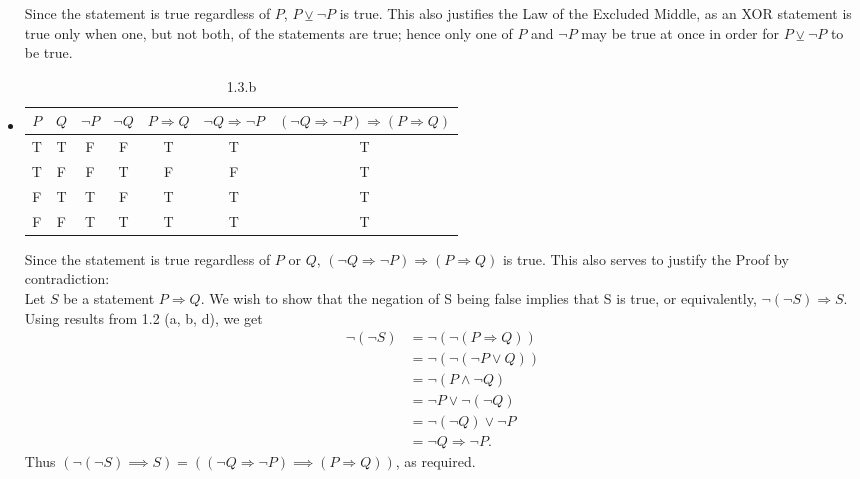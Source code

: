 \documentclass{homework}
\begin{document}
\begin{solution}
\begin{itemize}
\begin{table}[htpb]
\begin{tabular}{c|c|c}
        \end{tabular}
      \end{table}
      Since the statement is true regardless of $P$, $P \veebar \neg P$ is true. This also
      justifies the Law of the Excluded Middle, as an XOR statement is true only when one, but
      not both, of the statements are true; hence only one of $P$ and $\neg P$ may be true at
      once in order for $P \veebar \neg P$ to be true.
    \item 
      \begin{table}[htpb]
        \centering
        \caption{1.3.b}
        \begin{tabular}{c|c|c|c|c|c|c}
          $P$ & $Q$ & $\neg P$ &  $\neg Q$ & $P\Rightarrow Q$ & $\neg Q \Rightarrow \neg P$ & 
          $\left( \neg Q \Rightarrow \neg P \right) \Rightarrow \left( P\Rightarrow Q \right) $\\
          \toprule \bottomrule
          T & T & F & F & T & T & T\\
          T & F & F & T & F & F & T\\
          F & T & T & F & T & T & T\\
          F & F & T & T & T & T & T
        \end{tabular}
      \end{table}
      Since the statement is true regardless of $P$ or $Q$, $\left( \neg Q \Rightarrow \neg P
      \right) \Rightarrow \left( P\Rightarrow Q \right)$ is true. This also serves to justify the
      Proof by contradiction: \\

      Let $S$ be a statement $P\Rightarrow Q$. We wish to show that the negation of S being false
      implies that S is true, or equivalently, $\neg (\neg S) \Rightarrow S$. Using results from 1.2
      (a, b, d), we get
      \begin{align*}
       \neg (\neg S) &=  \neg (\neg \left( P\Rightarrow Q \right)) \\
                     &= \neg (\neg \left( \neg P\lor Q \right))  \\
                                                &= \neg \left( P\land \neg Q \right)  \\
                                                &= \neg P \lor \neg \left( \neg Q \right)  \\
                                                &= \neg (\neg Q) \lor \neg P\\
                                                &= \neg Q \Rightarrow \neg P
    .\end{align*}
    Thus $(\neg (\neg S) \implies S) = (\left( \neg Q\Rightarrow \neg P\right) \implies\left( P\Rightarrow Q \right)) $, as required.
  \end{itemize}
\end{solution}
\end{document}
